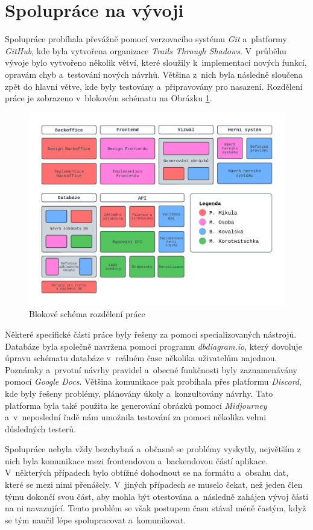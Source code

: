 \section{Spolupráce na vývoji}
Spolupráce probíhala převážně pomocí verzovacího systému \textit{Git} a~platformy \textit{GitHub}, kde byla vytvořena organizace \textit{Trails Through Shadows}. V~průběhu vývoje bylo vytvořeno několik větví, které sloužily k~implementaci nových funkcí, opravám chyb a~testování nových návrhů. Většina z~nich byla následně sloučena zpět do hlavní větve, kde byly testovány a~připravovány pro nasazení. Rozdělení práce je zobrazeno v~blokovém schématu na Obrázku \ref{fig:workflow}.

\begin{figure}[h]
  \centering
  \includegraphics[width=\textwidth]{../../shared/diagrams/blocks.pdf}
  \caption{Blokové schéma rozdělení práce}
  \label{fig:workflow}
\end{figure}

Některé specifické části práce byly řešeny za pomoci specializovaných nástrojů. Databáze byla společně navržena pomocí programu \textit{dbdiagram.io}, který dovoluje úpravu schématu databáze v~reálném čase několika uživatelům najednou. Poznámky a~prvotní návrhy pravidel a~obecné funkčnosti byly zaznamenávány pomocí \textit{Google Docs}. Většina komunikace pak probíhala přes platformu \textit{Discord}, kde byly řešeny problémy, plánovány úkoly a~konzultovány návrhy. Tato platforma byla také použita ke generování obrázků pomocí \textit{Midjourney} a~v~neposlední řadě nám umožnila testování za pomoci několika velmi důsledných testerů.

Spolupráce nebyla vždy bezchybná a~občasně se problémy vyskytly, největším z nich byla komunikace mezi frontendovou a~backendovou částí aplikace. V~některých případech bylo obtížné dohodnout se na formátu a~obsahu dat, které se mezi nimi přenášely. V~jiných případech se muselo čekat, než jeden člen týmu dokončí svou část, aby mohla být otestována a~následně zahájen vývoj části na ni navazující. Tento problém se však postupem času stával méně častým, když se tým naučil lépe spolupracovat a~komunikovat.
